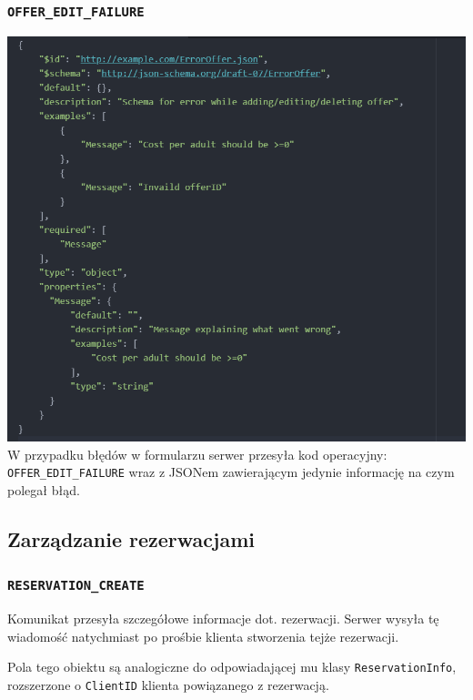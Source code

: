 \documentclass{article}
\begin{document}
\subsubsection{\texttt{OFFER\_EDIT\_FAILURE}}
\includegraphics[width=\linewidth]{Oferta-Hotel-Serwer/Offer_Error.png}
W przypadku błędów w formularzu serwer przesyła kod operacyjny: \texttt{OFFER\_EDIT\_FAILURE} wraz z JSONem zawierającym jedynie informację na czym polegał błąd.

\subsection{Zarządzanie rezerwacjami}

\subsubsection{\texttt{RESERVATION\_CREATE}} \label{reservation_info}
Komunikat przesyła szczegółowe informacje dot. rezerwacji. Serwer wysyła tę wiadomość natychmiast po prośbie klienta stworzenia tejże rezerwacji.

Pola tego obiektu są analogiczne do odpowiadającej mu klasy \texttt{ReservationInfo}, rozszerzone o \texttt{ClientID} klienta powiązanego z rezerwacją.
\end{document}
